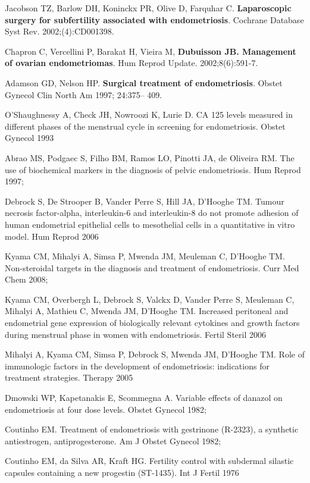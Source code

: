 \documentclass[12pt]{article} %
\begin{document}
Jacobson TZ, Barlow DH, Koninckx PR, Olive D, Farquhar C.\textbf{ Laparoscopic surgery for subfertility associated with endometriosis}. Cochrane Database Syst Rev. 2002;(4):CD001398.


Chapron C, Vercellini P, Barakat H, Vieira M, \textbf{Dubuisson JB. Management of ovarian endometriomas}. Hum Reprod Update. 2002;8(6):591-7.

Adamson GD, Nelson HP. \textbf{Surgical treatment of endometriosis}. Obstet Gynecol Clin North Am 1997; 24:375– 409. 



O'Shaughnessy A, Check JH, Nowroozi K, Lurie D.
CA 125 levels measured in different phases of the menstrual cycle in screening for endometriosis. Obstet Gynecol 1993

Abrao MS, Podgaec S, Filho BM, Ramos LO, Pinotti JA, de Oliveira RM. The use of biochemical markers in the diagnosis of pelvic endometriosis. Hum Reprod 1997;

Debrock S, De Strooper B, Vander Perre S, Hill JA, D'Hooghe TM.
Tumour necrosis factor-alpha, interleukin-6 and interleukin-8 do not promote adhesion of human endometrial epithelial cells to mesothelial cells in a quantitative in vitro model. Hum Reprod 2006

Kyama CM, Mihalyi A, Simsa P, Mwenda JM, Meuleman C, D'Hooghe TM. Non-steroidal targets in the diagnosis and treatment of endometriosis. Curr Med Chem 2008;

Kyama CM, Overbergh L, Debrock S, Valckx D, Vander Perre S, Meuleman C, Mihalyi A, Mathieu C, Mwenda JM, D'Hooghe TM.
Increased peritoneal and endometrial gene expression of biologically relevant cytokines and growth factors during menstrual phase in women with endometriosis. Fertil Steril 2006

Mihalyi A, Kyama CM, Simsa P, Debrock S, Mwenda JM, D'Hooghe TM.
Role of immunologic factors in the development of endometriosis: indications for treatment strategies. Therapy 2005

Dmowski WP, Kapetanakis E, Scommegna A. Variable effects of danazol on endometriosis at four dose levels. Obstet Gynecol 1982;

 Coutinho EM. Treatment of endometriosis with gestrinone (R-2323), a synthetic antiestrogen, antiprogesterone. Am J Obstet Gynecol 1982; 
 
 Coutinho EM, da Silva AR, Kraft HG. Fertility control with subdermal silastic capsules containing a new progestin (ST-1435). Int J Fertil 1976
\end{document}
